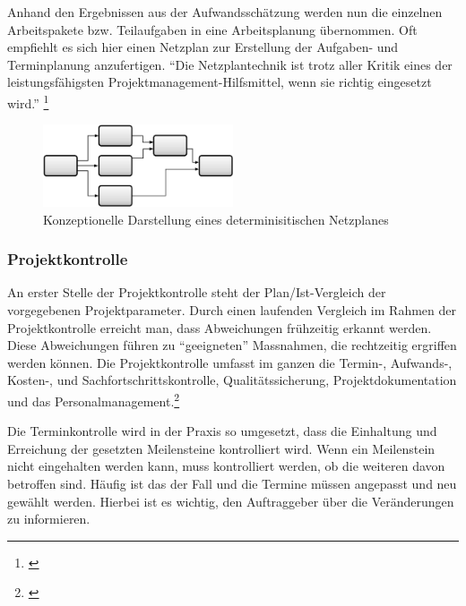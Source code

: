 Anhand den Ergebnissen aus der Aufwandsschätzung werden nun die einzelnen
Arbeitspakete bzw. Teilaufgaben in eine Arbeitsplanung übernommen. Oft empfiehlt
es sich hier einen Netzplan zur Erstellung der Aufgaben- und Terminplanung
anzufertigen. ``Die Netzplantechnik ist trotz aller Kritik eines der 
leistungsfähigsten Projektmanagement-Hilfsmittel, wenn sie richtig eingesetzt wird.''
\footnote{\citealp*[S. 14]{burghardt2007einfuehrung}}

\begin{figure}[htbp]
\begin{center}
\includegraphics[width=0.5\textwidth,angle=0]{./bilder/theorie/03_darstellung_netzplan.pdf}
\caption{Konzeptionelle Darstellung eines determinisitischen Netzplanes}
\label{pic:03_darstellung_netzplan}
\end{center}
\end{figure}


\subsubsection{Projektkontrolle}
An erster Stelle der Projektkontrolle steht der Plan/Ist-Vergleich der vorgegebenen
Projektparameter. Durch einen laufenden Vergleich im Rahmen der Projektkontrolle
erreicht man, dass Abweichungen frühzeitig erkannt werden. Diese Abweichungen
führen zu ``geeigneten'' Massnahmen, die rechtzeitig ergriffen werden können.
Die Projektkontrolle umfasst im ganzen die Termin-, Aufwands-, Kosten-, 
und Sachfortschrittskontrolle, Qualitätssicherung, Projektdokumentation und
das Personalmanagement.\footnote{\citealp*[Vgl.][S. 15]{burghardt2007einfuehrung}}

Die Terminkontrolle wird in der Praxis so umgesetzt, dass die Einhaltung
und Erreichung der gesetzten Meilensteine kontrolliert wird. Wenn ein 
Meilenstein nicht eingehalten werden kann, muss kontrolliert werden, ob die
weiteren davon betroffen sind. Häufig ist das der Fall und die Termine
müssen angepasst und neu gewählt werden. Hierbei ist es wichtig, den Auftraggeber
über die Veränderungen zu informieren.

